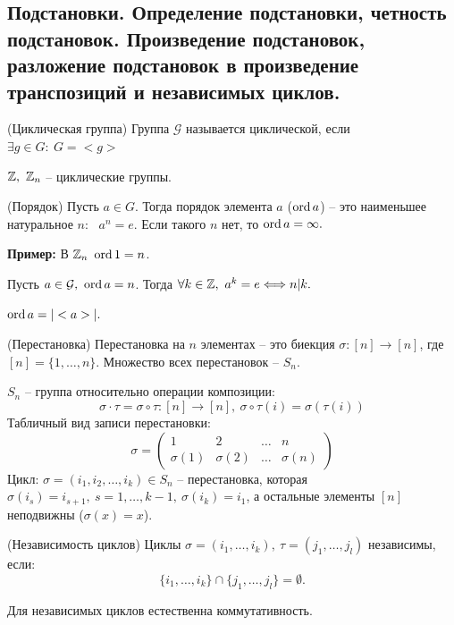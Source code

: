 \begin{multicols}{2}
\section{Подстановки. Определение подстановки, четность подстановок. Произведение подстановок, разложение подстановок в произведение транспозиций и независимых циклов.}
\begin{definition}{(Циклическая группа)}{}
    Группа $\mathcal{G}$ называется циклической, если $\exists g \in G: \ G = <g>$
\end{definition}
$\mathbb{Z}, \ \mathbb{Z}_n$ -- циклические группы.
\begin{definition}{(Порядок)}{}
    Пусть $a\in G$. Тогда порядок элемента $a$ ($\operatorname{ord} a$) -- это наименьшее натуральное $n$: \ $a^n = e$. Если такого $n$ нет, то $\operatorname{ord} a = \infty.$
\end{definition}
\textbf{Пример:} В $\mathbb{Z}_n \ \operatorname{ord} 1 = n$.
\begin{proposition}{}{}
    Пусть $a\in \mathcal{G}, \ \operatorname{ord} a = n$. Тогда $\forall k \in \mathbb{Z}, \ a^k = e \Longleftrightarrow n|k.$
\end{proposition}
\begin{proposition}{}{}
    $\operatorname{ord} a = |<a>|.$
\end{proposition}
\begin{definition}{(Перестановка)}{}
    Перестановка на $n$ элементах -- это биекция $\sigma : [n] \to [n]$, где $[n] = \{1 , \ldots, n\}$. Множество всех перестановок -- $S_n$. 
\end{definition}
$S_n$ -- группа относительно операции композиции:
\[
    \sigma \cdot \tau = \sigma \circ \tau: [n]\to [n], \ \sigma \circ \tau(i) = \sigma(\tau(i))  
\]
Табличный вид записи перестановки:
\[
    \sigma = \begin{pmatrix}
        1 & 2 & \ldots & n\\
        \sigma(1) & \sigma(2) & \ldots & \sigma(n)
    \end{pmatrix}
\] 
Цикл: $\sigma = (i_1, i_2, \ldots, i_k) \in S_n$ -- перестановка, которая $\sigma(i_s) = i_{s+1},\ s=1, \ldots, k-1, \ \sigma(i_k) = i_1$, а остальные элементы $[n]$ неподвижны ($\sigma(x) = x$).
\begin{definition}{(Независимость циклов)}{}
    Циклы $\sigma = (i_1, \ldots, i_k), \ \tau = (j_1, \ldots, j_l)$ независимы, если:
    \[
        \{i_1, \ldots, i_k\} \cap \{j_1, \ldots, j_l\} = \emptyset.    
    \]
\end{definition}
Для независимых циклов естественна коммутативность.
\begin{proposition}{}{}

\end{proposition}
\end{multicols}
